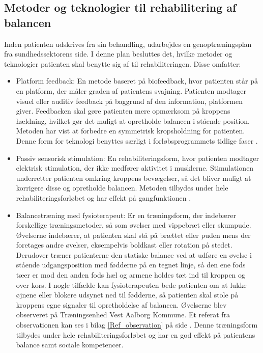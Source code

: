 \subsection{Metoder og teknologier til rehabilitering af balancen}
Inden patienten udskrives fra sin behandling, udarbejdes en genoptræningsplan fra sundhedssektorens side. I denne plan besluttes det, hvilke metoder og teknologier patienten skal benytte sig af til rehabiliteringen. Disse omfatter: \cite{Sundhedsstyrelsen2011a}  

\begin{itemize} \label{rehabiliteringbalance}
\item Platform feedback: En metode baseret på biofeedback, hvor patienten står på en platform, der måler graden af patientens svajning. Patienten modtager visuel eller auditiv feedback på baggrund af den information, platformen giver. Feedbacken skal gøre patienten mere opmærksom på kroppens hældning, hvilket gør det muligt at opretholde balancen i stående position. Metoden har vist at forbedre en symmetrisk kropsholdning for patienten. \cite{Barclay-Goddard2004} Denne form for teknologi benyttes særligt i forløbsprogrammets tidlige faser \cite{Sundhedsstyrelsen2011a}.
\item Passiv sensorisk stimulation: En rehabiliteringsform, hvor patienten modtager elektrisk stimulation, der ikke medfører aktivitet i musklerne. Stimulationen underretter patienten omkring kroppens bevægelser, så det bliver muligt at korrigere disse og opretholde balancen. \cite{Sundhedsstyrelsen2010} Metoden tilbydes under hele rehabiliteringsforløbet og har effekt på gangfunktionen \cite{Sundhedsstyrelsen2011a}.
\item Balancetræning med fysioterapeut: Er en træningsform, der indebærer forskellige træningsmetoder, så som øvelser med vippebræt eller skumpude. Øvelserne indebærer, at patienten skal stå på brættet eller puden mens der foretages andre øvelser, eksempelvis boldkast eller rotation på stedet. Derudover træner patienterne den statiske balance ved at udføre en øvelse i stående udgangsposition med fødderne på en tegnet linje, så den ene fods tæer er mod den anden fods hæl og armene holdes tæt ind til kroppen og over kors. I nogle tilfælde kan fysioterapeuten bede patienten om at lukke øjnene eller blokere udsynet ned til fødderne, så patienten skal stole på kroppens egne signaler til opretholdelse af balancen. \cite{Joergensen2004} Øvelserne blev observeret på Træningsenhed Vest Aalborg Kommune. Et referat fra observationen kan ses i bilag \ref{Ref_observation} på side \pageref{Ref_observation}. Denne træningsform tilbydes under hele rehabiliteringsforløbet og har en god effekt på patientens balance samt sociale kompetencer. \cite{Sundhedsstyrelsen2011a}

\end{itemize}
